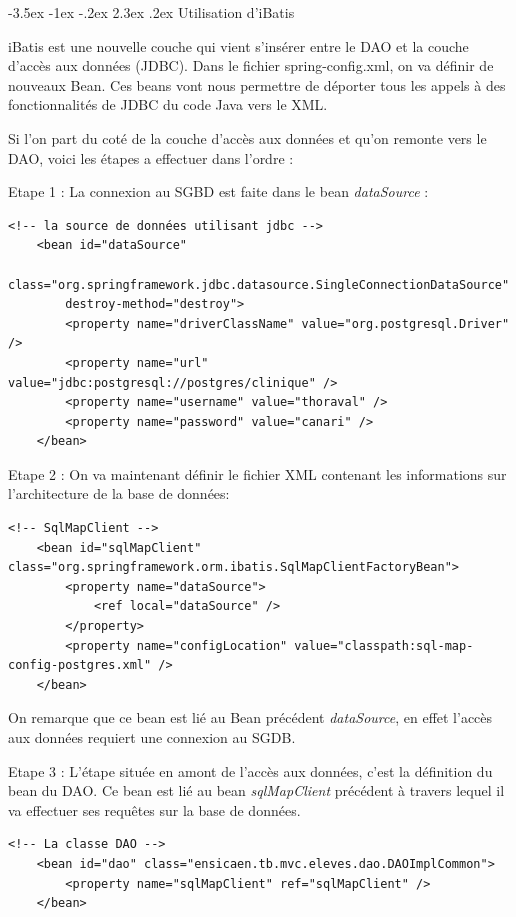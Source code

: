 \documentclass[a4paper,12pt]{article}
\makeatletter
\renewcommand\section{\@startsection {section}{1}{\z@}%
                           {-3.5ex \@plus -1ex \@minus -.2ex}%
                           {2.3ex \@plus.2ex}%
                           {\normalfont\Large\bfseries}}
\makeatother
\begin{document}
\section{Utilisation d'iBatis}

iBatis est une nouvelle couche qui vient s'insérer entre le DAO et la couche d'accès aux données (JDBC).
Dans le fichier spring-config.xml, on va définir de nouveaux Bean. Ces beans vont nous permettre de déporter tous les appels à des fonctionnalités de 
JDBC du code Java vers le XML.

Si l'on part du coté de la couche d'accès aux données et qu'on remonte vers le DAO, voici les étapes a effectuer dans l'ordre :

Etape 1 : La connexion au SGBD est faite dans le bean \textit{dataSource} : 

\begin{lstlisting}
<!-- la source de données utilisant jdbc -->
	<bean id="dataSource"
		class="org.springframework.jdbc.datasource.SingleConnectionDataSource"
		destroy-method="destroy">
		<property name="driverClassName" value="org.postgresql.Driver" />
		<property name="url" value="jdbc:postgresql://postgres/clinique" />
		<property name="username" value="thoraval" />
		<property name="password" value="canari" />
	</bean>
\end{lstlisting}

Etape 2 : On va maintenant définir le fichier XML contenant les informations sur l'architecture de la base de données:

\begin{lstlisting}
<!-- SqlMapClient -->
	<bean id="sqlMapClient" class="org.springframework.orm.ibatis.SqlMapClientFactoryBean">
		<property name="dataSource">
			<ref local="dataSource" />
		</property>
		<property name="configLocation" value="classpath:sql-map-config-postgres.xml" />
	</bean>
\end{lstlisting}

On remarque que ce bean est lié au Bean précédent \textit{dataSource}, en effet l'accès aux données requiert une connexion au SGDB.

Etape 3 : L'étape située en amont de l'accès aux données, c'est la définition du bean du DAO. Ce bean est lié au bean \textit{sqlMapClient} précédent
à travers lequel il va effectuer ses requêtes sur la base de données.

\begin{lstlisting}
<!-- La classe DAO -->
	<bean id="dao" class="ensicaen.tb.mvc.eleves.dao.DAOImplCommon">
		<property name="sqlMapClient" ref="sqlMapClient" />
	</bean>
\end{lstlisting}
\end{document}
